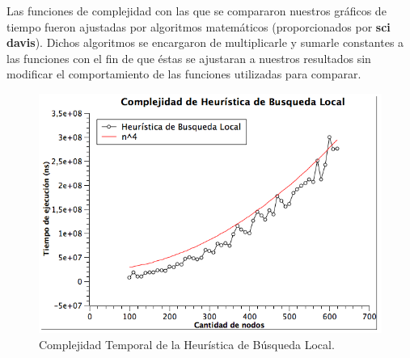 Las funciones de complejidad con las que se compararon nuestros gráficos de tiempo fueron ajustadas por algoritmos matemáticos (proporcionados por \textbf{sci davis}). Dichos algoritmos se encargaron de multiplicarle y sumarle constantes a las funciones con el fin de que éstas se ajustaran a nuestros resultados sin modificar el comportamiento de las funciones utilizadas para comparar.
\begin{figure}[H] %
\begin{center}
\includegraphics[width=350pt]{../imgs/complejidad_local.png}
\caption{Complejidad Temporal de la Heurística de Búsqueda Local.}
\end{center}
\end{figure}
